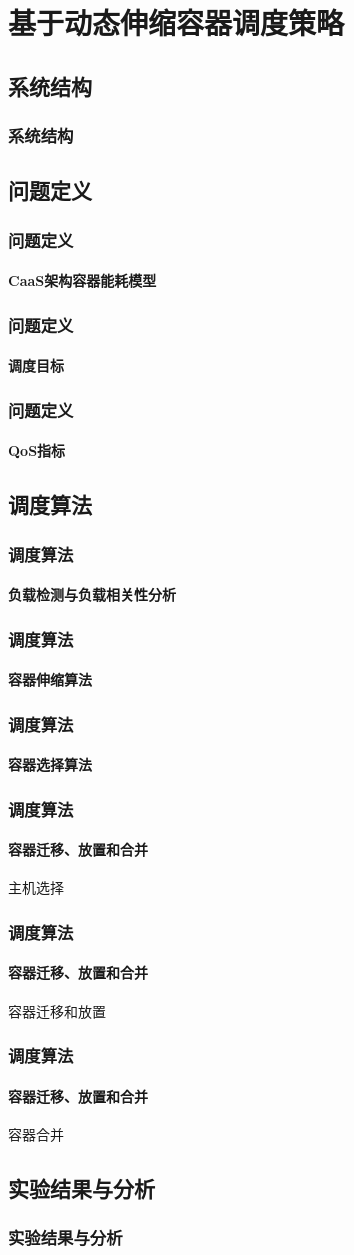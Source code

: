 \section{基于动态伸缩容器调度策略}

\subsection{系统结构}

\begin{frame}
\frametitle{系统结构}
\end{frame}

\subsection{问题定义}

\begin{frame}
\frametitle{问题定义}
\framesubtitle{CaaS架构容器能耗模型}
\end{frame}


\begin{frame}
\frametitle{问题定义}
\framesubtitle{调度目标}
\end{frame}

\begin{frame}
\frametitle{问题定义}
\framesubtitle{QoS指标}
\end{frame}

\subsection{调度算法}

\begin{frame}
\frametitle{调度算法}
\framesubtitle{负载检测与负载相关性分析}
\end{frame}

\begin{frame}
\frametitle{调度算法}
\framesubtitle{容器伸缩算法}
\end{frame}

\begin{frame}
\frametitle{调度算法}
\framesubtitle{容器选择算法}
\end{frame}

\begin{frame}
\frametitle{调度算法}
\framesubtitle{容器迁移、放置和合并}
主机选择
\end{frame}

\begin{frame}
\frametitle{调度算法}
\framesubtitle{容器迁移、放置和合并}
容器迁移和放置
\end{frame}

\begin{frame}
\frametitle{调度算法}
\framesubtitle{容器迁移、放置和合并}
容器合并
\end{frame}

\subsection{实验结果与分析}

\begin{frame}
\frametitle{实验结果与分析}
\end{frame}
